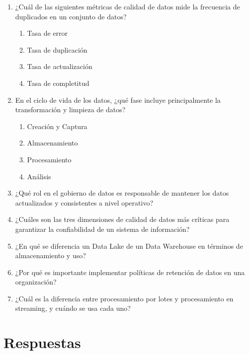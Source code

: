 \documentclass[12pt]{article}
\begin{document}
\begin{enumerate}[label=\arabic*.]
\item ¿Cuál de las siguientes métricas de calidad de datos mide la frecuencia de duplicados en un conjunto de datos?
\begin{enumerate}
    \item Tasa de error
    \item Tasa de duplicación
    \item Tasa de actualización
    \item Tasa de completitud
\end{enumerate}

\item En el ciclo de vida de los datos, ¿qué fase incluye principalmente la transformación y limpieza de datos?
\begin{enumerate}
    \item Creación y Captura
    \item Almacenamiento
    \item Procesamiento
    \item Análisis
\end{enumerate}

\item ¿Qué rol en el gobierno de datos es responsable de mantener los datos actualizados y consistentes a nivel operativo?
\item ¿Cuáles son las tres dimensiones de calidad de datos más críticas para garantizar la confiabilidad de un sistema de información?
\item ¿En qué se diferencia un Data Lake de un Data Warehouse en términos de almacenamiento y uso?
\item ¿Por qué es importante implementar políticas de retención de datos en una organización?
\item ¿Cuál es la diferencia entre procesamiento por lotes y procesamiento en streaming, y cuándo se usa cada uno?

\end{enumerate}

\newpage
\section*{Respuestas}
\end{document}
